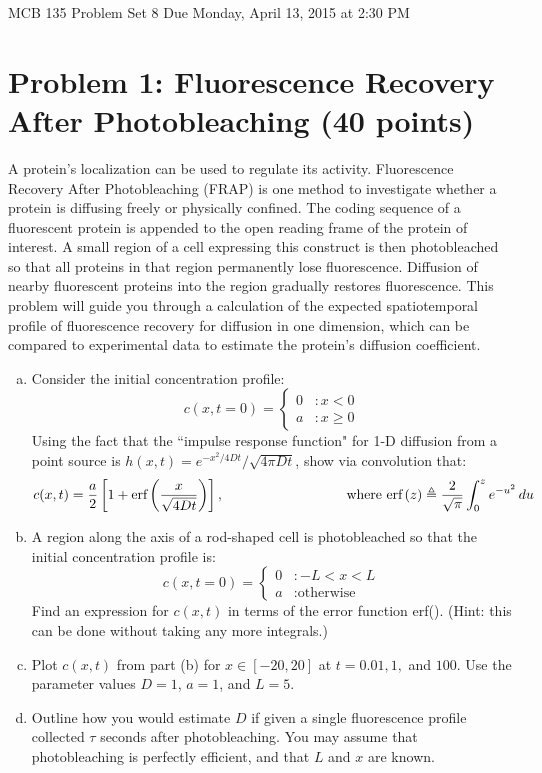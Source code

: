 \documentclass{article}
\begin{document}
\large

MCB 135 Problem Set 8 \hfill Due Monday, April 13, 2015 at 2:30 PM

\section*{Problem 1: Fluorescence Recovery After Photobleaching (40 points)}

A protein's localization can be used to regulate its activity. Fluorescence Recovery After Photobleaching (FRAP) is one method to investigate whether a protein is diffusing freely or physically confined. The coding sequence of a fluorescent protein is appended to the open reading frame of the protein of interest. A small region of a cell expressing this construct is then photobleached so that all proteins in that region permanently lose fluorescence. Diffusion of nearby fluorescent proteins into the region gradually restores fluorescence. This problem will guide you through a calculation of the expected spatiotemporal profile of fluorescence recovery for diffusion in one dimension, which can be compared to experimental data to estimate the protein's diffusion coefficient.
\begin{enumerate}[a)]
\item Consider the initial concentration profile:
\[ c(x,t=0) = \left\{
     \begin{array}{lr}
       0 & : x < 0\\
       a & : x \geq 0
     \end{array}
   \right. \]
Using the fact that the ``impulse response function" for 1-D diffusion from a point source is $h(x,t)=e^{-x^2/4Dt}/\sqrt{4\pi D t}$, show via convolution that:
\[ c(x,t) = \frac{a}{2} \left[ 1 + \textrm{erf} \left( \frac{x}{\sqrt{4Dt}} \right)\right], \hspace{3 cm} \textrm{ where }\textrm{erf} \left( z \right) \triangleq \frac{2}{\sqrt{\pi}} \int_0^z e^{-u^2} \, du \]
\item A region along the axis of a rod-shaped cell is photobleached so that the initial concentration profile is:
\[ c(x,t=0) = \left\{
     \begin{array}{lr}
       0 & : -L < x < L\\
       a & : \textrm{otherwise}
     \end{array}
   \right. \]
Find an expression for $c(x,t)$ in terms of the error function erf(). (Hint:  this can be done without taking any more integrals.)
\item Plot $c(x,t)$ from part (b) for $x\in[-20,20]$ at $t=0.01, 1,$ and $100$. Use the parameter values $D=1$, $a=1$, and $L=5$.
\item Outline how you would estimate $D$ if given a single fluorescence profile collected $\tau$ seconds after photobleaching. You may assume that photobleaching is perfectly efficient, and that $L$ and $x$ are known.
\end{enumerate}
\end{document}
